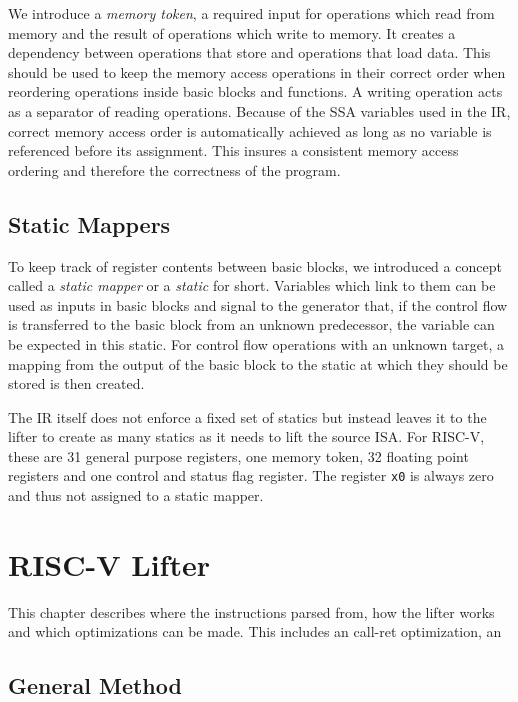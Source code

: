 \documentclass[course=eragp]{aspdoc}
\begin{document}
We introduce a \emph{memory token}, a required input for operations which read from memory and the
result of operations which write to memory. It creates a dependency between operations that store
and operations that load data. This should be used to keep the memory access operations
in their correct order when reordering operations inside basic blocks and functions. A writing
operation acts as a separator of reading operations. Because of the SSA variables used in the IR,
correct memory access order is automatically achieved as long as no variable is referenced before
its assignment. This insures a consistent memory access ordering and therefore the correctness of the
program.

\subsection{Static Mappers}\label{statics}

To keep track of register contents between basic blocks, we introduced a concept called a
\textit{static mapper} or a \textit{static} for short.
Variables which link to them can be used as inputs in basic blocks and signal to the generator that, if the control flow is transferred to the basic block from an unknown predecessor, the variable can be expected in this static.
For control flow operations with an unknown target, a mapping from the output of the basic block to the static at which they should be stored is then created.

\par

The IR itself does not enforce a fixed set of statics but instead leaves it to the lifter to create as many statics as it needs to lift the source ISA.
For RISC-V, these are 31 general purpose registers, one memory token, 32 floating point registers
and one control and status flag register. The register \texttt{x0} is always zero and thus not
assigned to a static mapper.

\section{RISC-V Lifter}\label{sec:riscv_lifter}

This chapter describes where the instructions parsed from, how the lifter works and which
optimizations can be made. This includes an call-ret optimization, an

\subsection{General Method}
\end{document}

